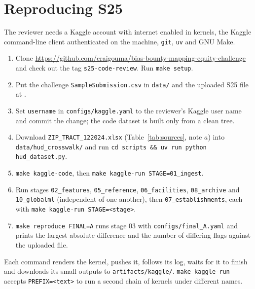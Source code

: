 \documentclass[11pt]{article}
\newcommand{\repo}{\url{https://github.com/craigouma/bias-bounty-mapping-equity-challenge}}
\begin{document}
\section{Reproducing S25}
\label{sec:repro}

The reviewer needs a Kaggle account with internet enabled in kernels, the
Kaggle command-line client authenticated on the machine, \texttt{git},
\texttt{uv} and GNU Make.

\begin{enumerate}[itemsep=3pt]
\item Clone \repo{} and check out the tag \texttt{s25-code-review}. Run
\texttt{make setup}.
\item Put the challenge \texttt{SampleSubmission.csv} in \texttt{data/} and
the uploaded S25 file at
.
\item Set \texttt{username} in \texttt{configs/kaggle.yaml} to the reviewer's
Kaggle user name and commit the change; the code dataset is built only from
a clean tree.
\item Download \texttt{ZIP\_TRACT\_122024.xlsx} (Table~\ref{tab:sources},
note $a$) into \texttt{data/hud\_crosswalk/} and run
\texttt{cd scripts \&\& uv run python hud\_dataset.py}.
\item \texttt{make kaggle-code}, then \texttt{make kaggle-run STAGE=01\_ingest}.
\item Run stages \texttt{02\_features}, \texttt{05\_reference},
\texttt{06\_facilities}, \texttt{08\_archive} and \texttt{10\_globalml}
(independent of one another), then \texttt{07\_establishments}, each with
\texttt{make kaggle-run STAGE=<stage>}.
\item \texttt{make reproduce FINAL=A} runs stage 03 with
\texttt{configs/final\_A.yaml} and prints the largest absolute difference and
the number of differing flags against the uploaded file.
\end{enumerate}

Each command renders the kernel, pushes it, follows its log, waits for it to
finish and downloads its small outputs to \texttt{artifacts/kaggle/}.
\texttt{make kaggle-run} accepts \texttt{PREFIX=<text>} to run a second chain
of kernels under different names.
\end{document}
